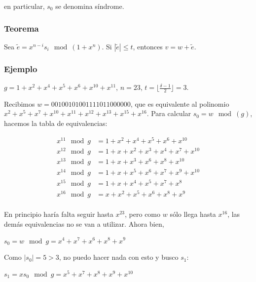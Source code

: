 \documentclass[10pt,a4paper]{article}
\begin{document}
en particular, $s_0$ se denomina síndrome.

\subsubsection*{Teorema}

Sea $\tilde{e} = x^{n-i}s_i \mod (1+x^n)$. Si $|\tilde{e}|\leq t$, entonces $v = w+ \tilde{e}$.

\subsubsection*{Ejemplo}

$g = 1 + x^2 + x^4 + x^5 + x^6 + x^{10} + x^{11}$, $n = 23$, $t = \lfloor \frac{\delta - 1}{2} \rfloor= 3$.

Recibimos $w = 0 0 1 0 0 1 0 1 0 0 1 1 1 1 0 1 1 0 0 0 0 0 0$, que es equivalente al polinomio $x^2+x^5+x^7+x^{10}+x^{11}+x^{12} + x^{13} + x^{15} + x^{16}$. Para calcular $s_0 = w \mod (g)$, hacemos la tabla de equivalencias:

\begin{center}
\begin{align*} x^{11} \mod g &= 1 + x^2 + x^4 + x^5 + x^6 + x^{10}\\ x^{12} \mod g &= 1+x+x^2+x^3+x^4+x^7+x^{10}\\ x^{13} \mod g &= 1 + x + x^3 + x^6 +x^{8}+x^{10}\\ x^{14} \mod g &= 1 + x +x^{5}+x^{ 6}+x^{ 7}+x^{ 9}+x^{ 10}\\ x^{15} \mod g &= 1 + x+x^{ 4}+x^{ 5}+x^{ 7}+x^{ 8}\\ x^{16} \mod g &= x +x^{2}+x^{ 5}+x^{ 6}+x^{ 8}+x^{ 9}\\ \end{align*}
\end{center}

En principio haría falta seguir hasta $x^{23}$, pero como $w$ sólo llega hasta $x^{16}$, las demás equivalencias no se van a utilizar. Ahora bien,

\begin{center}
$s_0 = w \mod g = x^{4}+x^{ 7}+x^{ 6}+x^{ 8}+x^{ 9}$
\end{center}

Como $|s_0| = 5 > 3$, no puedo hacer nada con esto y busco $s_1$:

\begin{center}
$s_1 = x s_0 \mod g= x^{5}+x^{ 7}+x^{ 8}+x^{ 9}+x^{ 10}$
\end{center}
\end{document}
